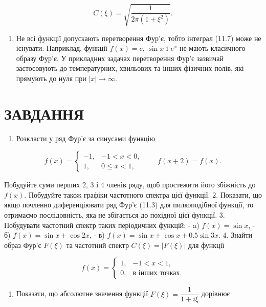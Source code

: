 \documentclass[
  ukrainian,
]{article}
\providecommand{\tightlist}{%
  \setlength{\itemsep}{0pt}\setlength{\parskip}{0pt}}
\begin{document}
\[
C(\xi) = \sqrt{\frac{1}{2\pi(1+\xi^2)}}.
\]

\begin{enumerate}
\def\labelenumi{\arabic{enumi}.}
\setcounter{enumi}{2}
\tightlist
\item
  Не всі функції допускають перетворення Фур'є, тобто інтеграл (11.7)
  може не існувати. Наприклад, функції \(f(x)=c\), \(\sin x\) і \(e^x\)
  не мають класичного образу Фур'є. У прикладних задачах перетворення
  Фур'є зазвичай застосовують до температурних, хвильових та інших
  фізичних полів, які прямують до нуля при \(|x|\to\infty\).
\end{enumerate}

\section{ЗАВДАННЯ}\label{ux437ux430ux432ux434ux430ux43dux43dux44f-9}

\begin{enumerate}
\def\labelenumi{\arabic{enumi}.}
\tightlist
\item
  Розкласти у ряд Фур'є за синусами функцію
\end{enumerate}

\[
f(x)=
\begin{cases}
-1, & -1 < x < 0,\\
1, & 0 \le x < 1,
\end{cases}
\qquad
f(x+2)=f(x).
\]

Побудуйте суми перших 2, 3 і 4 членів ряду, щоб простежити його
збіжність до \(f(x)\). Побудуйте також графіки частотного спектра цієї
функції. 2. Показати, що якщо почленно диференціювати ряд Фур'є (11.3)
для пилкоподібної функції, то отримаємо послідовність, яка не збігається
до похідної цієї функції. 3. Побудувати частотний спектр таких
періодичних функцій: - a) \(f(x)=\sin x\), - б) \(f(x)=\sin x+\cos 2x\),
- в) \(f(x)=\sin x+\cos x+0.5\sin 3x\). 4. Знайти образ Фур'є \(F(\xi)\)
та частотний спектр \(C(\xi)=|F(\xi)|\) для функції

\[
f(x)=
\begin{cases}
1, & -1 < x < 1,\\
0, & \text{в інших точках.}
\end{cases}
\]

\begin{enumerate}
\def\labelenumi{\arabic{enumi}.}
\setcounter{enumi}{4}
\tightlist
\item
  Показати, що абсолютне значення функції \(F(\xi)=\dfrac{1}{1+i\xi}\)
  дорівнює
\end{enumerate}
\end{document}
